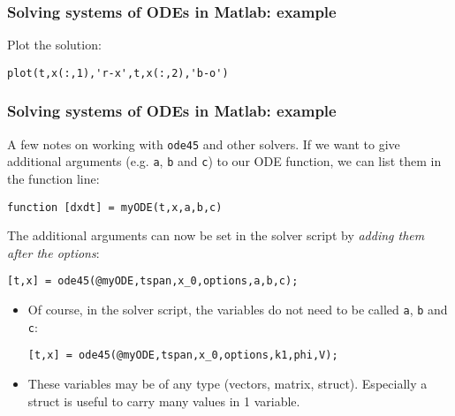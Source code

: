 \documentclass[11pt,table,final,fleqn,xcolor={usenames,dvipsnames,table}]{beamer}
\begin{document}
\begin{frame}[fragile]
  \frametitle{Solving systems of ODEs in Matlab: example}
  Plot the solution:
  \begin{lstlisting}
plot(t,x(:,1),'r-x',t,x(:,2),'b-o')
  \end{lstlisting}
  \pause
  \begin{center}
  \end{center}
\end{frame}

\begin{frame}[fragile]
  \frametitle{Solving systems of ODEs in Matlab: example}
  A few notes on working with \lstinline$ode45$ and other solvers. If we want to give additional arguments (e.g. \lstinline$a$, \lstinline$b$ and \lstinline$c$) to our ODE function, we can list them in the function line:
  \begin{lstlisting}
function [dxdt] = myODE(t,x,a,b,c)
  \end{lstlisting}
  The additional arguments can now be set in the solver script by \emph{adding them after the options}:
  \begin{lstlisting}
[t,x] = ode45(@myODE,tspan,x_0,options,a,b,c);
    \end{lstlisting}
  \pause
  \begin{itemize}
    \item Of course, in the solver script, the variables do not need to be called \lstinline$a$, \lstinline$b$ and \lstinline$c$:
      \begin{lstlisting}
[t,x] = ode45(@myODE,tspan,x_0,options,k1,phi,V);
    \end{lstlisting}
    \item These variables may be of any type (vectors, matrix, struct). Especially a struct is useful to carry many values in 1 variable.
  \end{itemize}
\end{frame}
\end{document}
